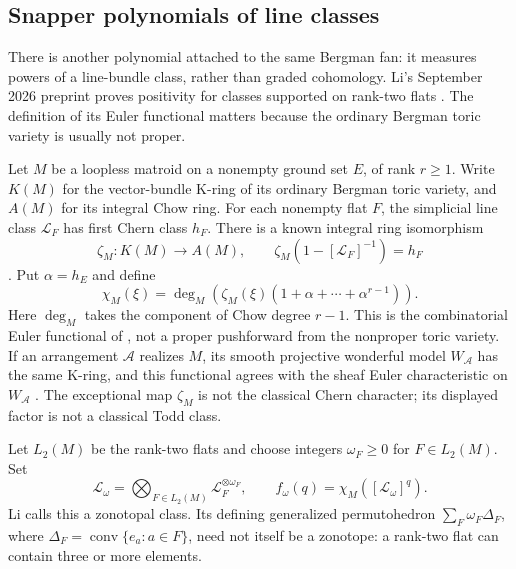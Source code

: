 \subsection{Snapper polynomials of line classes}
\label{sec:appG-matroid-Snapper}

There is another polynomial attached to the same Bergman fan:
it measures powers of a line-bundle class, rather than graded
cohomology. Li's September 2026 preprint proves positivity for
classes supported on rank-two flats
\cite[Theorems~3.6--3.7]{Li26Snapper}. The definition of its Euler
functional matters because the ordinary Bergman toric variety is
usually not proper.

Let $M$ be a loopless matroid on a nonempty ground set $E$, of
rank $r\ge1$. Write $K(M)$ for the vector-bundle K-ring of its
ordinary Bergman toric variety, and $A(M)$ for its integral Chow
ring. For each nonempty flat $F$, the simplicial line class
$\mathcal L_F$ has first Chern class $h_F$. There is a known
integral ring isomorphism
\[
 \zeta_M:K(M)\longrightarrow A(M),\qquad
 \zeta_M(1-[\mathcal L_F]^{-1})=h_F
\]
\cite[Theorem~1.8]{LLPP24KRings}. Put $\alpha=h_E$ and define
\[
 \chi_M(\xi)=
 \deg_M\!\left(\zeta_M(\xi)
       (1+\alpha+\cdots+\alpha^{r-1})\right).
\]
Here $\deg_M$ takes the component of Chow degree $r-1$.
This is the combinatorial Euler functional of
\cite[\S1.5]{LLPP24KRings}, not a proper pushforward from the
nonproper toric variety. If an arrangement $\mathcal A$
realizes $M$, its smooth projective wonderful model
$W_{\mathcal A}$ has the same K-ring, and this functional
agrees with the sheaf Euler characteristic on $W_{\mathcal A}$
\cite[Proposition~1.6 and \S1.5]{LLPP24KRings}.
The exceptional map $\zeta_M$ is not the classical Chern
character; its displayed factor is not a classical Todd class.

Let $L_2(M)$ be the rank-two flats and choose integers
$\omega_F\ge0$ for $F\in L_2(M)$. Set
\[
 \mathcal L_\omega=\bigotimes_{F\in L_2(M)}
                         \mathcal L_F^{\otimes\omega_F},
 \qquad f_\omega(q)=\chi_M([\mathcal L_\omega]^q).
\]
Li calls this a zonotopal class. Its defining generalized
permutohedron $\sum_F\omega_F\Delta_F$, where
$\Delta_F=\operatorname{conv}\{e_a:a\in F\}$, need not itself
be a zonotope: a rank-two flat can contain three or more elements.

